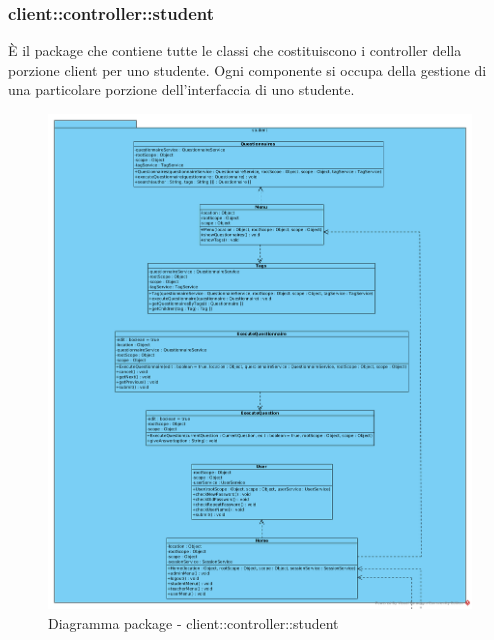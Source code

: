 \subsubsection{client::controller::student}
È il package che contiene tutte le classi che costituiscono i controller della porzione client per uno studente. Ogni componente si occupa della gestione di una particolare porzione dell'interfaccia di uno studente.\begin{center}
		\begin{figure}[H]
			\centering \includegraphics[scale=4, max width=\textwidth, max height=\myheight]{../img/diagrammiClassi/client/controller/student.png}
			\caption{Diagramma package - client::controller::student}
		\end{figure}
	\end{center}\hypertarget{client::controller::student::Home}{}
